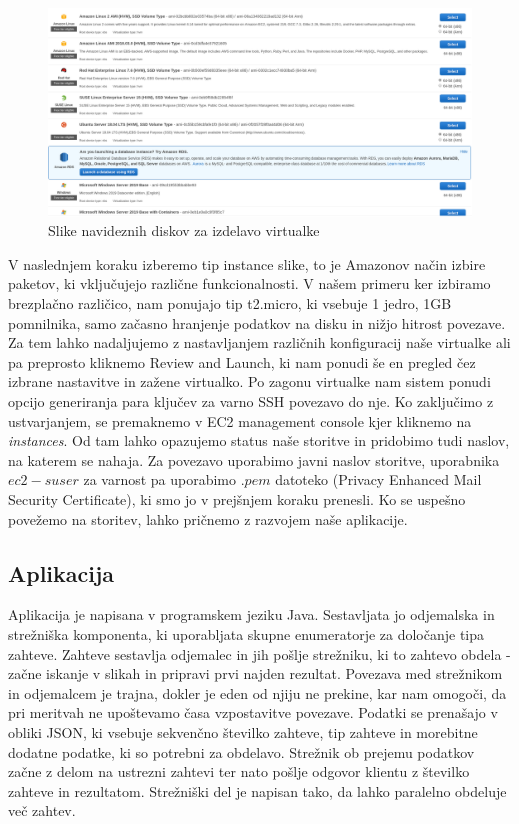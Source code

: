 \begin{figure}[H]
    \centering
    \includegraphics[scale=0.25]{Img/1_AWS_images.png}
    \caption{Slike navideznih diskov za izdelavo virtualke}
    \label{fig:1_AWS_images}
\end{figure}

V naslednjem koraku izberemo tip instance slike, to je Amazonov način izbire paketov, ki vključujejo različne funkcionalnosti. V našem primeru ker izbiramo brezplačno različico, nam ponujajo tip t2.micro, ki vsebuje 1 jedro, 1GB pomnilnika, samo začasno hranjenje podatkov na disku in nižjo hitrost povezave. Za tem lahko nadaljujemo z nastavljanjem različnih konfiguracij naše virtualke ali pa preprosto kliknemo Review and Launch, ki nam ponudi še en pregled čez izbrane nastavitve in zažene virtualko. Po zagonu virtualke nam sistem ponudi opcijo generiranja para ključev za varno SSH povezavo do nje. Ko zaključimo z ustvarjanjem, se premaknemo v EC2 management console kjer kliknemo na \emph{instances}. Od tam lahko opazujemo status naše storitve in pridobimo tudi naslov, na katerem se nahaja. Za povezavo uporabimo javni naslov storitve, uporabnika $ec2-suser$ za varnost pa uporabimo $.pem$ datoteko (Privacy Enhanced Mail Security Certificate), ki smo jo v prejšnjem koraku prenesli. Ko se uspešno povežemo na storitev, lahko pričnemo z razvojem naše aplikacije.

\subsection{Aplikacija}

Aplikacija je napisana v programskem jeziku Java. Sestavljata jo odjemalska in strežniška komponenta, ki uporabljata skupne enumeratorje za določanje tipa zahteve. Zahteve sestavlja odjemalec in jih pošlje strežniku, ki to zahtevo obdela - začne iskanje v slikah in pripravi prvi najden rezultat. Povezava med strežnikom in odjemalcem je trajna, dokler je eden od njiju ne prekine, kar nam omogoči, da pri meritvah ne upoštevamo časa vzpostavitve povezave. Podatki se prenašajo v obliki JSON, ki vsebuje sekvenčno številko zahteve, tip zahteve in morebitne dodatne podatke, ki so potrebni za obdelavo. Strežnik ob prejemu podatkov začne z delom na ustrezni zahtevi ter nato pošlje odgovor klientu z številko zahteve in rezultatom. Strežniški del je napisan tako, da lahko paralelno obdeluje več zahtev.

